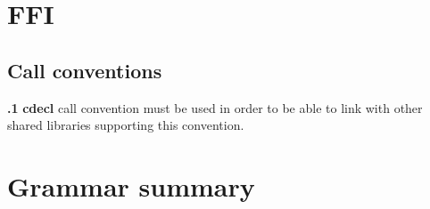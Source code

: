 \documentclass[leqno]{article}
\begin{document}
    \section{FFI}
        \subsection{Call conventions}
            \textbf{\thesubsection.1} \textbf{cdecl} call convention must be used in order
            to be able to link with other shared libraries supporting this convention.

    \section{Grammar summary}
        \itshape
        \setlength{\grammarindent}{12em}
\end{document}
